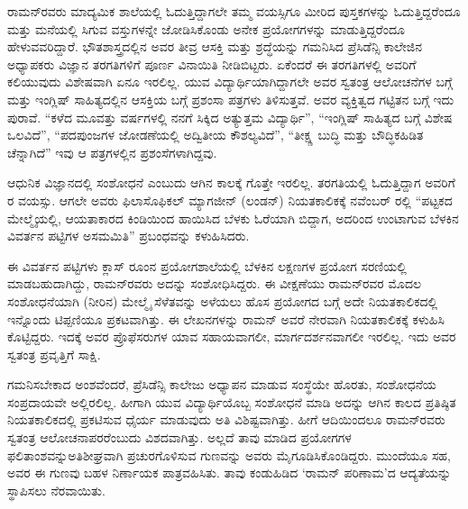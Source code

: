 ರಾಮನ್‍ರವರು ಮಾದ್ಯಮಿಕ ಶಾಲೆಯಲ್ಲಿ ಓದುತ್ತಿದ್ದಾಗಲೇ ತಮ್ಮ ವಯಸ್ಸಿಗೂ ಮೀರಿದ ಪುಸ್ತಕಗಳನ್ನು ಓದುತ್ತಿದ್ದರೆಂದೂ ಮತ್ತು ಮನೆಯಲ್ಲಿ ಸಿಗುವ ವಸ್ತುಗಳನ್ನೇ ಜೋಡಿಸಿಕೊಂಡು ಅನೇಕ ಪ್ರಯೋಗಗಳನ್ನು ಮಾಡುತ್ತಿದ್ದರೆಂದೂ ಹೇಳುವವರಿದ್ದಾರೆ. ಭೌತಶಾಸ್ತ್ರದಲ್ಲಿನ ಅವರ ತೀವ್ರ ಆಸಕ್ತಿ ಮತ್ತು ಶ್ರದ್ಧೆಯನ್ನು ಗಮನಿಸಿದ ಪ್ರೆಸಿಡೆನ್ಸಿ ಕಾಲೇಜಿನ ಅಧ್ಯಾಪಕರು ವಿಜ್ಞಾನ ತರಗತಿಗಳಿಗೆ ಪೂರ್ಣ ವಿನಾಯಿತಿ ನೀಡಿಬಿಟ್ಟರು. ಏಕೆಂದರೆ ಈ ತರಗತಿಗಳಲ್ಲಿ ಅವರಿಗೆ ಕಲಿಯುವುದು ವಿಶೇಷವಾಗಿ ಏನೂ ಇರಲಿಲ್ಲ. ಯುವ ವಿದ್ಯಾರ್ಥಿಯಾಗಿದ್ದಾಗಲೇ ಅವರ ಸ್ವತಂತ್ರ ಆಲೋಚನೆಗಳ ಬಗ್ಗೆ ಮತ್ತು ಇಂಗ್ಲಿಷ್ ಸಾಹಿತ್ಯದಲ್ಲಿನ ಆಸಕ್ತಿಯ ಬಗ್ಗೆ ಪ್ರಶಂಸಾ ಪತ್ರಗಳು ತಿಳಿಸುತ್ತವೆ. ಅವರ ವ್ಯಕ್ತಿತ್ವದ ಗಟ್ಟಿತನ ಬಗ್ಗೆ ಇದು ಪುರಾವೆ. “ಕಳೆದ ಮೂವತ್ತು ವರ್ಷಗಳಲ್ಲಿ ನನಗೆ ಸಿಕ್ಕಿದ ಅತ್ಯುತ್ತಮ ವಿದ್ಯಾರ್ಥಿ”, “ಇಂಗ್ಲಿಷ್ ಸಾಹಿತ್ಯದ ಬಗ್ಗೆ ವಿಶೇಷ ಒಲವಿದೆ”, “ಪದಪುಂಜಗಳ ಜೋಡಣೆಯಲ್ಲಿ ಅದ್ವಿತೀಯ ಕೌಶಲ್ಯವಿದೆ”, “ತೀಕ್ಷ್ಣ ಬುದ್ಧಿ ಮತ್ತು ಬೌದ್ಧಿಕಹಿಡಿತ ಚೆನ್ನಾಗಿದೆ”  ಇವು ಆ ಪತ್ರಗಳಲ್ಲಿನ ಪ್ರಶಂಸೆಗಳಾಗಿದ್ದವು.

ಆಧುನಿಕ ವಿಜ್ಞಾನದಲ್ಲಿ ಸಂಶೋಧನೆ ಎಂಬುದು ಆಗಿನ ಕಾಲಕ್ಕೆ ಗೊತ್ತೇ ಇರಲಿಲ್ಲ.  ತರಗತಿಯಲ್ಲಿ ಓದುತ್ತಿದ್ದಾಗ ಅವರಿಗೆ ರ ವಯಸ್ಸು. ಆಗಲೇ ಅವರು ಫಿಲಾಸೊಫಿಕಲ್ ಮ್ಯಾಗಜೀನ್ (ಲಂಡನ್) ನಿಯತಕಾಲಿಕಕ್ಕೆ ನವೆಂಬರ್ ರಲ್ಲಿ “ಪಟ್ಟಕದ ಮೇಲ್ಮೈಯಲ್ಲಿ, ಆಯತಾಕಾರದ ಕಿಂಡಿಯಿಂದ ಹಾಯಿಸಿದ ಬೆಳಕು ಓರೆಯಾಗಿ ಬಿದ್ದಾಗ, ಅದರಿಂದ ಉಂಟಾಗುವ ಬೆಳಕಿನ ವಿವರ್ತನ ಪಟ್ಟಿಗಳ ಅಸಮಮಿತಿ”  ಪ್ರಬಂಧವನ್ನು ಕಳುಹಿಸಿದರು.

ಈ ವಿವರ್ತನ ಪಟ್ಟಿಗಳು ಕ್ಲಾಸ್ ರೂಂನ ಪ್ರಯೋಗಶಾಲೆಯಲ್ಲಿ ಬೆಳಕಿನ ಲಕ್ಷಣಗಳ ಪ್ರಯೋಗ ಸರಣಿಯಲ್ಲಿ ಮಾಡಬಹುದಾಗಿದ್ದು, ರಾಮನ್‍ರವರು ಅದನ್ನು ಸಂಶೋಧಿಸಿದ್ದರು. ಈ ವೀಕ್ಷಣೆಯು ರಾಮನ್‍ರವರ ಮೊದಲ ಸಂಶೋಧನೆಯಾಗಿ (ನೀರಿನ) ಮೇಲ್ಮೈ ಸೆಳೆತವನ್ನು ಅಳೆಯಲು ಹೊಸ ಪ್ರಯೋಗದ ಬಗ್ಗೆ ಅದೇ ನಿಯತಕಾಲಿಕದಲ್ಲಿ ಇನ್ನೊಂದು ಟಿಪ್ಪಣಿಯೂ ಪ್ರಕಟವಾಗಿತ್ತು. ಈ ಲೇಖನಗಳನ್ನು ರಾಮನ್ ಅವರೆ ನೇರವಾಗಿ ನಿಯತಕಾಲಿಕಕ್ಕೆ ಕಳುಹಿಸಿ ಕೊಟ್ಟಿದ್ದರು. ಇದಕ್ಕೆ ಅವರ ಪ್ರೊಫೆಸರುಗಳ ಯಾವ ಸಹಾಯವಾಗಲೀ, ಮಾರ್ಗದರ್ಶನವಾಗಲೀ ಇರಲಿಲ್ಲ. ಇದು ಅವರ ಸ್ವತಂತ್ರ ಪ್ರವೃತ್ತಿಗೆ ಸಾಕ್ಷಿ.

ಗಮನಿಸಬೇಕಾದ ಅಂಶವೆಂದರೆ, ಪ್ರೆಸಿಡೆನ್ಸಿ ಕಾಲೇಜು ಅಧ್ಯಾಪನ ಮಾಡುವ ಸಂಸ್ಥೆಯೇ ಹೊರತು, ಸಂಶೋಧನೆಯ ಸಂಪ್ರದಾಯವೇ ಅಲ್ಲಿರಲಿಲ್ಲ. ಹೀಗಾಗಿ ಯುವ ವಿದ್ಯಾರ್ಥಿಯೊಬ್ಬ ಸಂಶೋಧನೆ ಮಾಡಿ ಅದನ್ನು ಆಗಿನ ಕಾಲದ ಪ್ರತಿಷ್ಠಿತ ನಿಯತಕಾಲಿಕದಲ್ಲಿ ಪ್ರಕಟಿಸುವ ಧೈರ್ಯ ಮಾಡುವುದು ಅತಿ ವಿಶಿಷ್ಟವಾಗಿತ್ತು. ಹೀಗೆ ಆದಿಯಿಂದಲೂ ರಾಮನ್‍ರವರು ಸ್ವತಂತ್ರ ಆಲೋಚನಾ\-ಪರರೆಂಬುದು ವಿಶದವಾಗಿತ್ತು. ಅಲ್ಲದೆ ತಾವು ಮಾಡಿದ ಪ್ರಯೋಗಗಳ ಫಲಿತಾಂಶವನ್ನು\break ಅತಿಶೀಘ್ರವಾಗಿ ಪ್ರಚುರಗೊಳಿಸುವ ಗುಣವನ್ನು ಅವರು ಮೈಗೂಡಿಸಿಕೊಂಡಿದ್ದರು. ಮುಂದೆಯೂ ಸಹ, ಅವರ ಈ ಗುಣವು ಬಹಳ ನಿರ್ಣಾಯಕ ಪಾತ್ರವಹಿಸಿತು. ತಾವು ಕಂಡುಹಿಡಿದ ‘ರಾಮನ್ ಪರಿಣಾಮ’ದ ಆದ್ಯತೆಯನ್ನು ಸ್ಥಾಪಿಸಲು ನೆರವಾಯಿತು.

